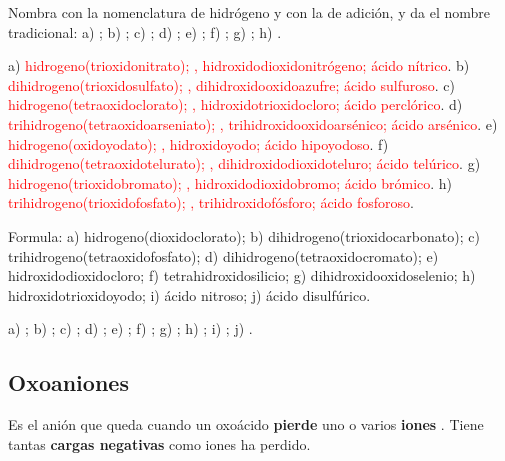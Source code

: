 \begin{exercise}
    Nombra con la nomenclatura de hidrógeno y con la de adición, y da el nombre tradicional: a) ; b) ; c)
    ; d) ; e) ; f) ; g) ; h) .
    \begin{solu}
        a) \textcolor{red}{hidrogeno(trioxidonitrato); , hidroxidodioxidonitrógeno; ácido nítrico}.
        b) \textcolor{red}{dihidrogeno(trioxidosulfato); , dihidroxidooxidoazufre; ácido sulfuroso}.
        c) \textcolor{red}{hidrogeno(tetraoxidoclorato); , hidroxidotrioxidocloro; ácido perclórico}.
        d) \textcolor{red}{trihidrogeno(tetraoxidoarseniato); , trihidroxidooxidoarsénico; ácido arsénico}.
        e) \textcolor{red}{hidrogeno(oxidoyodato); , hidroxidoyodo; ácido hipoyodoso}.
        f) \textcolor{red}{dihidrogeno(tetraoxidotelurato); , dihidroxidodioxidoteluro; ácido telúrico}.
        g) \textcolor{red}{hidrogeno(trioxidobromato); , hidroxidodioxidobromo; ácido brómico}.
        h) \textcolor{red}{trihidrogeno(trioxidofosfato); , trihidroxidofósforo; ácido fosforoso}.
    \end{solu}
\end{exercise}

\begin{exercise}
    Formula: a) hidrogeno(dioxidoclorato); b) dihidrogeno(trioxidocarbonato); c) trihidrogeno(tetraoxidofosfato); d)
    dihidrogeno(tetraoxidocromato); e) hidroxidodioxidocloro; f) tetrahidroxidosilicio; g) dihidroxidooxidoselenio; h)
    hidroxidotrioxidoyodo; i) ácido nitroso; j) ácido disulfúrico.
    \begin{solu}
        a) \textcolor{red}{}; b) \textcolor{red}{}; c) \textcolor{red}{}; d)
        \textcolor{red}{}; e) \textcolor{red}{}; f) \textcolor{red}{}; g)
        \textcolor{red}{}; h) \textcolor{red}{}; i) \textcolor{red}{}; j)
        \textcolor{red}{}.
    \end{solu}
\end{exercise}

\subsection{Oxoaniones}\label{sec:ud5-oxoaniones}

\begin{definition}[Oxoanión]
    Es el anión que queda cuando un oxoácido \textbf{pierde} uno o varios \textbf{iones }. Tiene tantas \textbf{cargas
    negativas} como iones  ha perdido.
\end{definition}

